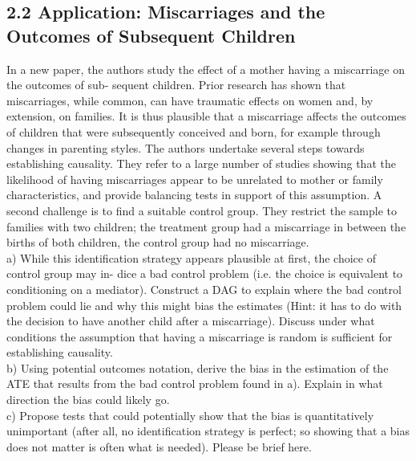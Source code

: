 \documentclass[a4paper,12pt,oneside,English]{article}
\begin{document}
\subsection{2.2 
Application: Miscarriages and the Outcomes of Subsequent Children}
In a new paper, the authors study the effect of a mother having a miscarriage on the outcomes of sub- sequent children. Prior research has shown that miscarriages, while common, can have traumatic effects on women and, by extension, on families. It is thus plausible that a miscarriage affects the outcomes of children that were subsequently conceived and born, for example through changes in parenting styles.
The authors undertake several steps towards establishing causality. They refer to a large number of studies showing that the likelihood of having miscarriages appear to be unrelated to mother or family characteristics, and provide balancing tests in support of this assumption. A second challenge is to find a suitable control group. They restrict the sample to families with two children; the treatment group had a miscarriage in between the births of both children, the control group had no miscarriage.\\

a) While this identification strategy appears plausible at first, the choice of control group may in- dice a bad control problem (i.e. the choice is equivalent to conditioning on a mediator). Construct a DAG to explain where the bad control problem could lie and why this might bias the estimates (Hint: it has to do with the decision to have another child after a miscarriage). Discuss under what conditions the assumption that having a miscarriage is random is sufficient for establishing causality.\\
b) Using potential outcomes notation, derive the bias in the estimation of the ATE that results from the bad control problem found in a). Explain in what direction the bias could likely go.\\
c) Propose tests that could potentially show that the bias is quantitatively unimportant (after all, no identification strategy is perfect; so showing that a bias does not matter is often what is needed). Please be brief here.\\
\end{document}
